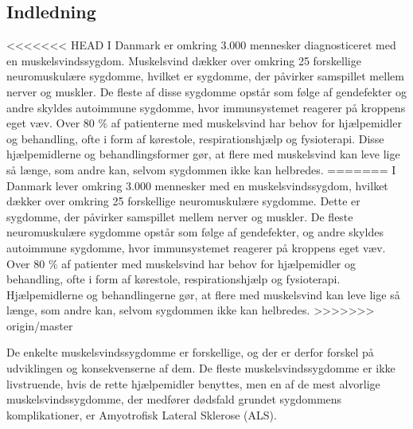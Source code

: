 \subsection{Indledning}


<<<<<<< HEAD
I Danmark er omkring 3.000 mennesker diagnosticeret med en muskelsvindssygdom. Muskelsvind dækker over omkring 25 forskellige neuromuskulære sygdomme, hvilket er sygdomme, der påvirker samspillet mellem nerver og muskler. De fleste af disse sygdomme opstår som følge af gendefekter og andre skyldes autoimmune sygdomme, hvor immunsystemet reagerer på kroppens eget væv. Over 80 \% af patienterne med muskelsvind har behov for hjælpemidler og behandling, ofte i form af kørestole, respirationshjælp og fysioterapi. Disse hjælpemidlerne og behandlingsformer gør, at flere med muskelsvind kan leve lige så længe, som andre kan, selvom sygdommen ikke kan helbredes. \citep{hvadermuskelsvind2016,sygdomsbeskrivelser2016}
=======
I Danmark lever omkring 3.000 mennesker med en muskelsvindssygdom, hvilket dækker over omkring 25 forskellige neuromuskulære sygdomme. Dette er sygdomme, der påvirker samspillet mellem nerver og muskler. De fleste neuromuskulære sygdomme opstår som følge af gendefekter, og andre skyldes autoimmune sygdomme, hvor immunsystemet reagerer på kroppens eget væv. Over 80 \% af patienter med muskelsvind har behov for hjælpemidler og behandling, ofte i form af kørestole, respirationshjælp og fysioterapi. Hjælpemidlerne og behandlingerne gør, at flere med muskelsvind kan leve lige så længe, som andre kan, selvom sygdommen ikke kan helbredes. \citep{hvadermuskelsvind2016,sygdomsbeskrivelser2016}
>>>>>>> origin/master

De enkelte muskelsvindssygdomme er forskellige, og der er derfor forskel på udviklingen og konsekvenserne af dem. De fleste muskelsvindssygdomme er ikke livstruende, hvis de rette hjælpemidler benyttes, men en af de mest alvorlige muskelsvindssygdomme, der medfører dødsfald grundet sygdommens komplikationer, er Amyotrofisk Lateral Sklerose (ALS).  \citep{hvadermuskelsvind2016}

